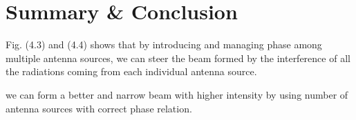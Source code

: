 \chapter{Summary \& Conclusion}

Fig. (4.3) and (4.4) shows that by introducing and managing phase among multiple antenna sources, we can steer the beam formed by the interference of all the radiations coming from each individual antenna source.

we can form a better and narrow beam with higher intensity by using number of antenna sources with correct phase relation.
